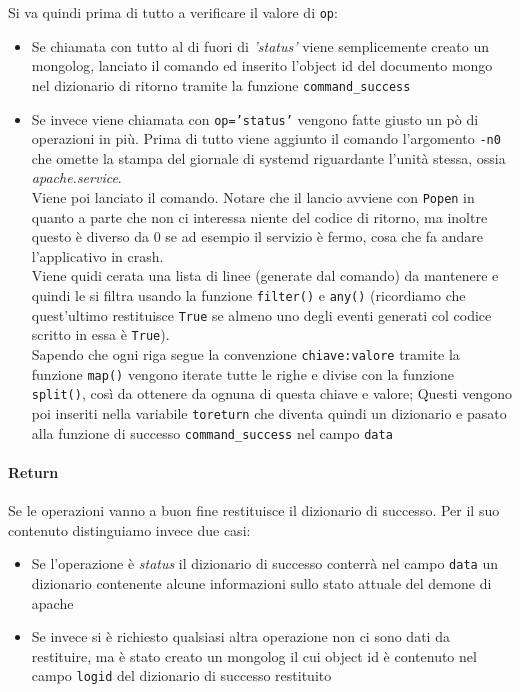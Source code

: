 \documentclass[11pt]{article}
\begin{document}
Si va quindi prima di tutto a verificare il valore di \texttt{op}:
\begin{itemize}
	\item{Se chiamata con tutto al di fuori di \textit{'status'} viene semplicemente creato un mongolog, lanciato il comando
		ed inserito l'object id del documento mongo nel dizionario di ritorno tramite la funzione \texttt{command\_success}}
	\item{Se invece viene chiamata con \texttt{op='status'} vengono fatte giusto un pò di operazioni in più. Prima di tutto
		viene aggiunto il comando l'argomento \texttt{-n0} che omette la stampa del giornale di systemd riguardante
		l'unità stessa, ossia \textit{apache.service}.\\
		Viene poi lanciato il comando. Notare che il lancio avviene con \texttt{Popen} in quanto a parte che non ci interessa
		niente del codice di ritorno, ma inoltre questo è diverso da 0 se ad esempio il servizio è fermo, cosa che fa andare
		l'applicativo in crash.\\
		Viene quidi cerata una lista di linee (generate dal comando) da mantenere e quindi le si filtra usando la funzione
		\texttt{filter()} e \texttt{any()} (ricordiamo che quest'ultimo restituisce \texttt{True} se almeno uno degli eventi
		generati col codice scritto in essa è \texttt{True}).\\
		Sapendo che ogni riga segue la convenzione \texttt{chiave:valore} tramite la funzione \texttt{map()} vengono iterate
		tutte le righe e divise con la funzione \texttt{split()}, così da ottenere da ognuna di questa chiave e valore;
		Questi vengono poi inseriti nella variabile \texttt{toreturn} che diventa quindi un dizionario e pasato
		alla funzione di successo \texttt{command\_success} nel campo \texttt{data}}
\end{itemize}
\paragraph{Return}
Se le operazioni vanno a buon fine restituisce il dizionario di successo. Per il suo contenuto distinguiamo invece due casi:
\begin{itemize}
	\item{Se l'operazione è \textit{status} il dizionario di successo conterrà nel campo \texttt{data} un dizionario
		contenente alcune informazioni sullo stato attuale del demone di apache}
	\item{Se invece si è richiesto qualsiasi altra operazione non ci sono dati da restituire, ma è stato creato un
		mongolog il cui object id è contenuto nel campo \texttt{logid} del dizionario di successo restituito}
\end{itemize}
\end{document}
